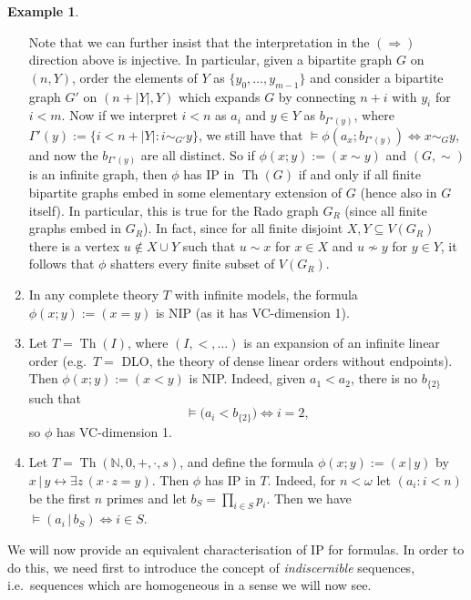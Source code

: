 \documentclass[a4paper]{report}
\newcommand{\ind}{\hspace{15pt}}
\newcommand{\Nat}{\mathbb{N}}
\renewcommand{\implies}{\Rightarrow}
\renewcommand{\iff}{\Leftrightarrow}
\newcommand{\siff}{\leftrightarrow}
\DeclareMathOperator{\Th}{Th}
\theoremstyle{definition}
\newtheorem{exmp}[thm]{Example}
\theoremstyle{remstyle}
\begin{document}
\begin{exmp}
\begin{enumerate}[itemsep=12pt]
		      \ind Note that we can further insist that the interpretation in the $(\implies)$ direction above is injective. In particular, given a bipartite graph $G$ on $(n,Y)$, order the elements of $Y$ as $\{y_0,\ldots,y_{m-1}\}$ and consider a bipartite graph $G'$ on $(n+|Y|,Y)$ which expands $G$ by connecting $n+i$ with $y_i$ for $i<m$. Now if we interpret $i<n$ as $a_i$ and $y\in Y$ as $b_{\Gamma'(y)}$, where $\Gamma'(y) :=\{i<n+|Y|:i\sim_{G'} y\}$, we still have that $\models\phi\left(a_x;b_{\Gamma'(y)}\right)\iff x\sim_G y$, and now the $b_{\Gamma'(y)}$ are all distinct. So if $\phi(x;y):=(x\sim y)$ and $(G,\sim)$ is an infinite graph, then $\phi$ has IP in $\Th(G)$ if and only if all finite bipartite graphs embed in some elementary extension of $G$ (hence also in $G$ itself). In particular, this is true for the Rado graph $G_R$ (since all finite graphs embed in $G_R$). In fact, since for all finite disjoint $X,Y\subseteq V(G_R)$ there is a vertex $u\not\in X\cup Y$ such that $u\sim x$ for $x\in X$ and $u\not\sim y$ for $y\in Y$, it follows that $\phi$ shatters every finite subset of $V(G_R)$.

		\item In any complete theory $T$ with infinite models, the formula $\phi(x;y) :=(x=y)$ is NIP (as it has VC-dimension 1).

		\item Let $T=\Th(I)$, where $(I,<,\ldots)$ is an expansion of an infinite linear order (e.g.\ $T=$ DLO, the theory of dense linear orders without endpoints). Then $\phi(x;y):=(x<y)$ is NIP. Indeed, given $a_1<a_2$, there is no $b_{\{2\}}$ such that
		      \begin{equation*}
			      \models \big(a_i < b_{\{2\}}\big) \iff i=2,
		      \end{equation*}
		      so $\phi$ has VC-dimension 1.
		\item Let $T=\Th(\Nat,0,+,\cdot,s)$, and define the formula $\phi(x;y) := (x\,|\, y)$ by $x\,|\, y\siff\exists z\,(x\cdot z=y)$. Then $\phi$ has IP in $T$. Indeed, for $n<\omega$ let $(a_i:i<n)$ be the first $n$ primes and let $b_S=\prod_{i\in S}p_i$. Then we have $\models (a_i\,|\, b_S)\iff i\in S$.
	\end{enumerate}
\end{exmp}

\ind We will now provide an equivalent characterisation of IP for formulas. In order to do this, we need first to introduce the concept of \emph{indiscernible} sequences, i.e.\ sequences which are homogeneous in a sense we will now see.
\end{document}
